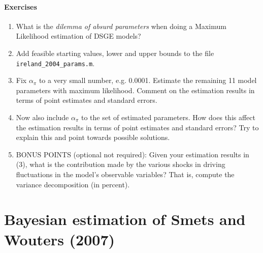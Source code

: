\documentclass{article}
\begin{document}
\paragraph{Exercises}
\begin{enumerate}
	\item What is the \emph{dilemma of absurd parameters} when doing a Maximum Likelihood estimation of DSGE models?
	\item Add feasible starting values, lower and upper bounds to the file \texttt{ireland\_2004\_params.m}.
	\item Fix $\alpha_\pi$ to a very small number, e.g. 0.0001. Estimate the remaining 11 model parameters with maximum likelihood. Comment on the estimation results in terms of point estimates and standard errors.
	\item Now also include $\alpha_\pi$ to the set of estimated parameters. How does this affect the estimation results in terms of point estimates and standard errors? Try to explain this and point towards possible solutions.
	\item BONUS POINTS (optional not required): Given your estimation results in (3), what is the contribution made by the various shocks in driving fluctuations in the model's observable variables? That is, compute the variance decomposition (in percent).
\end{enumerate}
	
\newpage 

\section[Bayesian estimation of Smets and Wouters (2007)]{Bayesian estimation of Smets and Wouters (2007)\label{ex:SW2007RWMH}}
\end{document}
